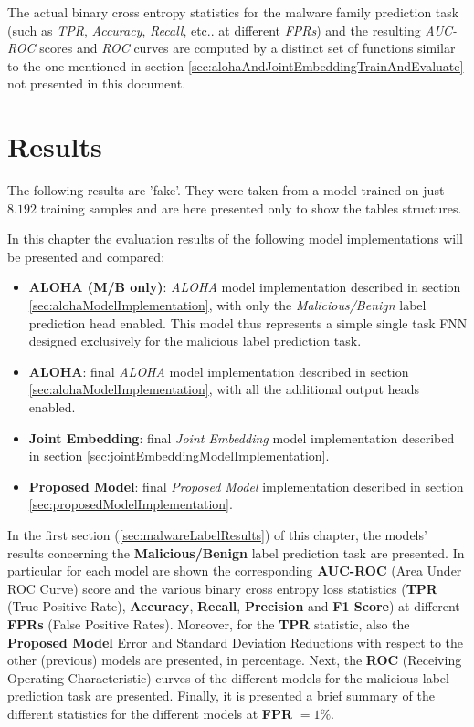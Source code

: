 \documentclass[pdfa%
,cucitura%
]{toptesi}
\begin{document}
The actual binary cross entropy statistics for the malware family prediction task (such as \textit{TPR}, \textit{Accuracy}, \textit{Recall}, etc.. at different \textit{FPRs}) and the resulting \textit{AUC-ROC} scores and \textit{ROC} curves are computed by a distinct set of functions similar to the one mentioned in section \ref{sec:alohaAndJointEmbeddingTrainAndEvaluate} not presented in this document.

\chapter{Results}\label{chap:results}
\color{Green}
The following results are 'fake'. They were taken from a model trained on just $8.192$ training samples and are here presented only to show the tables structures.
\color{Black}

In this chapter the evaluation results of the following model implementations will be presented and compared:
\begin{itemize}
	\item \textbf{ALOHA (M/B only)}: \textit{ALOHA} model implementation described in section \ref{sec:alohaModelImplementation}, with only the \textit{Malicious/Benign} label prediction head enabled. This model thus represents a simple single task FNN designed exclusively for the malicious label prediction task.
	
	\item \textbf{ALOHA}: final \textit{ALOHA} model implementation described in section \ref{sec:alohaModelImplementation}, with all the additional output heads enabled.
	
	\item \textbf{Joint Embedding}: final \textit{Joint Embedding} model implementation described in section \ref{sec:jointEmbeddingModelImplementation}.
	
	\item \textbf{Proposed Model}: final \textit{Proposed Model} implementation described in section \ref{sec:proposedModelImplementation}.
\end{itemize}

In the first section (\ref{sec:malwareLabelResults}) of this chapter, the models' results concerning the \textbf{Malicious/Benign} label prediction task are presented. In particular for each model are shown the corresponding \textbf{AUC-ROC} (Area Under ROC Curve) score and the various binary cross entropy loss statistics (\textbf{TPR} (True Positive Rate), \textbf{Accuracy}, \textbf{Recall}, \textbf{Precision} and \textbf{F1 Score}) at different \textbf{FPRs} (False Positive Rates). Moreover, for the \textbf{TPR} statistic, also the \textbf{Proposed Model} Error and Standard Deviation Reductions with respect to the other (previous) models are presented, in percentage. Next, the \textbf{ROC} (Receiving Operating Characteristic) curves of the different models for the malicious label prediction task are presented. Finally, it is presented a brief summary of the different statistics for the different models at \textbf{FPR} $=1\%$.
\end{document}
